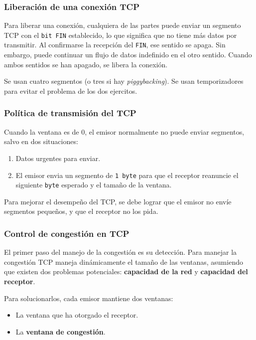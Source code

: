 \documentclass[10pt,a4paper]{article}
\begin{document}
\subsubsection{Liberación de una conexión TCP}

Para liberar una conexión, cualquiera de las partes puede enviar un segmento TCP con el \texttt{bit FIN} establecido, lo que significa que no tiene más datos por transmitir. Al confirmarse la recepción del \texttt{FIN}, ese sentido se apaga. Sin embargo, puede continuar un flujo de datos indefinido en el otro sentido. Cuando ambos sentidos se han apagado, se libera la conexión.

Se usan cuatro segmentos (o tres si hay \textit{piggybacking}). Se usan temporizadores para evitar el problema de los dos ejercitos.

\subsubsection{Política de transmisión del TCP}

Cuando la ventana es de 0, el emisor normalmente no puede enviar segmentos, salvo en dos situaciones:
\begin{enumerate}
\item Datos urgentes para enviar.
\item El emisor envia un segmento de \texttt{1 byte} para que el receptor reanuncie el siguiente \texttt{byte} esperado y el tamaño de la ventana.
\end{enumerate}

Para mejorar el desempeño del TCP, se debe lograr que el emisor no envíe segmentos pequeños, y que el receptor no los pida.

\subsubsection{Control de congestión en TCP}

El primer paso del manejo de la congestión es su detección. Para manejar la congestión TCP maneja dinámicamente el tamaño de las ventanas, asumiendo que existen dos problemas potenciales: \textbf{capacidad de la red} y \textbf{capacidad del receptor}.

Para solucionarlos, cada emisor mantiene dos ventanas:
\begin{itemize}
\item La ventana que ha otorgado el receptor.
\item La \textbf{ventana de congestión}.
\end{itemize}
\end{document}
